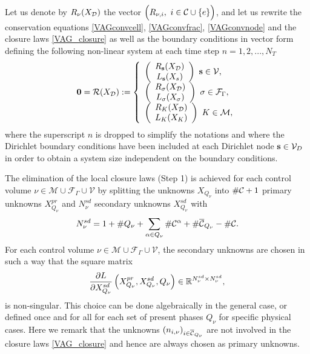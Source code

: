 \documentclass[final,1p,times]{elsarticle}
\def\D{\cal D}
\def\({\Bigl (}
\def\){\Bigr )}
\def\({\Bigl (}
\def\){\Bigr )}
\def\s{{\bf s}}
\def\D{{\cal D}}
\def\cells{{\cal M}}
\def\faces{{\cal F}}
\def\nodes{{\cal V}}
\begin{document}
Let us denote by $R_\nu(X_\D)$ the vector $\(R_{\nu,i}, \ i \in \mathcal{C}\cup\{e\}\) $, and 
let us rewrite the conservation equations \eqref{VAGconvcell}, \eqref{VAGconvfrac}, 
\eqref{VAGconvnode} and the closure laws \eqref{VAG_closure} as well 
as the boundary conditions in vector form defining the following 
non-linear system at each time step $n=1,2,...,N_T$
%
\begin{eqnarray}
\label{NonLinearSystem}
\mathbf{0} = \mathcal{R} (X_\D) := 
\left\{\begin{array}{llllll}
\left(\begin{array}{c}
R_{\s} (X_\D) \\
L_\s (X_s)
\end{array}\right) 
\ \s \in \nodes, \\
\left(\begin{array}{c}
R_{\sigma} (X_\D) \\
L_\sigma (X_\sigma)
\end{array}\right) 
\ \sigma \in \faces_\Gamma, \\
\left(\begin{array}{c}
R_{K} (X_\D) \\
L_K (X_K)
\end{array}\right) 
\ K \in \cells,
\end{array}\right.
\end{eqnarray}
%
where the superscript $n$ is dropped to simplify the notations 
and where the Dirichlet boundary conditions 
have been included at each Dirichlet node $\s\in {\cal V}_D$ in order to 
obtain a system size independent on the boundary conditions. 

 
The elimination of the local closure laws (Step 1) is achieved 
for each control volume $\nu\in{\mathcal{M} \cup \mathcal{F}_\Gamma \cup \mathcal{V}} $ by splitting the unknowns $X_{Q_\nu}$ into $\#{\cal C}+1$ primary unknowns 
$X_{Q_\nu}^{pr}$ and $N^{sd}_\nu$ secondary unknowns $X_{Q_\nu}^{sd}$ with 
$$
N^{sd}_\nu =   1 + \# Q_\nu + \sum_{\alpha\in Q_\nu} \#{\cal C}^\alpha 
+\#\overline{\cal C}_{Q_\nu} -\#{\cal C}. 
$$ 
For each control volume $\nu\in{\mathcal{M} \cup \mathcal{F}_\Gamma \cup \mathcal{V}}  $, 
the secondary unknowns are  chosen in such a way that the square matrix 
$$
{\partial L \over \partial X^{sd}_{Q_\nu} } \left(X^{pr}_{Q_\nu},X_{Q_\nu}^{sd}, Q_\nu\right)
\in \mathbb{R}^{N^{sd}_\nu \times N^{sd}_\nu},  
$$
is non-singular. This choice can be done algebraically in the general case, 
or defined once and for all for each set of present phases $Q_\nu$ 
for specific physical cases. Here we remark that the unknowns $(n_{i,\nu})_{i\in\overline{\cal C}_{Q_\nu}}$ are not involved in the closure laws \eqref{VAG_closure} and hence are 
always chosen as primary unknowns. 
\end{document}
